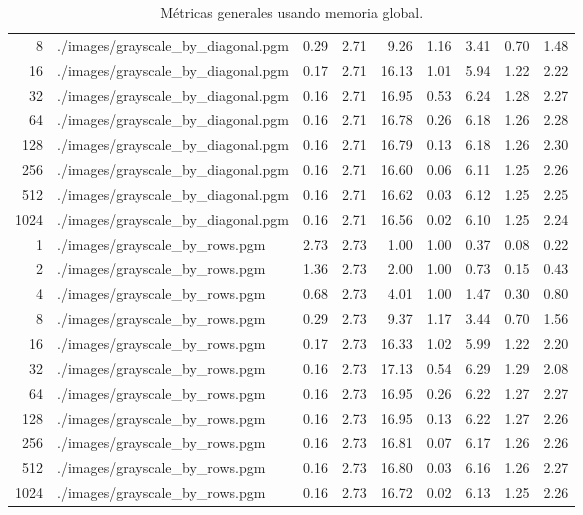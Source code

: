 \begin{table}[H]
\begin{adjustbox}{width=\textwidth, keepaspectratio}
\begin{tabular}{rlrrrrrrr}
                    8 & ./images/grayscale\_by\_diagonal.pgm & 0.29 & 2.71 & 9.26 & 1.16 & 3.41 & 0.70 & 1.48 \\
                    16 & ./images/grayscale\_by\_diagonal.pgm & 0.17 & 2.71 & 16.13 & 1.01 & 5.94 & 1.22 & 2.22 \\
                    32 & ./images/grayscale\_by\_diagonal.pgm & 0.16 & 2.71 & 16.95 & 0.53 & 6.24 & 1.28 & 2.27 \\
                    64 & ./images/grayscale\_by\_diagonal.pgm & 0.16 & 2.71 & 16.78 & 0.26 & 6.18 & 1.26 & 2.28 \\
                    128 & ./images/grayscale\_by\_diagonal.pgm & 0.16 & 2.71 & 16.79 & 0.13 & 6.18 & 1.26 & 2.30 \\
                    256 & ./images/grayscale\_by\_diagonal.pgm & 0.16 & 2.71 & 16.60 & 0.06 & 6.11 & 1.25 & 2.26 \\
                    512 & ./images/grayscale\_by\_diagonal.pgm & 0.16 & 2.71 & 16.62 & 0.03 & 6.12 & 1.25 & 2.25 \\
                    1024 & ./images/grayscale\_by\_diagonal.pgm & 0.16 & 2.71 & 16.56 & 0.02 & 6.10 & 1.25 & 2.24 \\
                    1 & ./images/grayscale\_by\_rows.pgm & 2.73 & 2.73 & 1.00 & 1.00 & 0.37 & 0.08 & 0.22 \\
                    2 & ./images/grayscale\_by\_rows.pgm & 1.36 & 2.73 & 2.00 & 1.00 & 0.73 & 0.15 & 0.43 \\
                    4 & ./images/grayscale\_by\_rows.pgm & 0.68 & 2.73 & 4.01 & 1.00 & 1.47 & 0.30 & 0.80 \\
                    8 & ./images/grayscale\_by\_rows.pgm & 0.29 & 2.73 & 9.37 & 1.17 & 3.44 & 0.70 & 1.56 \\
                    16 & ./images/grayscale\_by\_rows.pgm & 0.17 & 2.73 & 16.33 & 1.02 & 5.99 & 1.22 & 2.20 \\
                    32 & ./images/grayscale\_by\_rows.pgm & 0.16 & 2.73 & 17.13 & 0.54 & 6.29 & 1.29 & 2.08 \\
                    64 & ./images/grayscale\_by\_rows.pgm & 0.16 & 2.73 & 16.95 & 0.26 & 6.22 & 1.27 & 2.27 \\
                    128 & ./images/grayscale\_by\_rows.pgm & 0.16 & 2.73 & 16.95 & 0.13 & 6.22 & 1.27 & 2.26 \\
                    256 & ./images/grayscale\_by\_rows.pgm & 0.16 & 2.73 & 16.81 & 0.07 & 6.17 & 1.26 & 2.26 \\
                    512 & ./images/grayscale\_by\_rows.pgm & 0.16 & 2.73 & 16.80 & 0.03 & 6.16 & 1.26 & 2.27 \\
                    1024 & ./images/grayscale\_by\_rows.pgm & 0.16 & 2.73 & 16.72 & 0.02 & 6.13 & 1.25 & 2.26 \\
                    \bottomrule
                \end{tabular}
            \end{adjustbox}
            \caption{Métricas generales usando memoria global.}
            \label{tab:histogram_metrics_global}
        \end{table}

